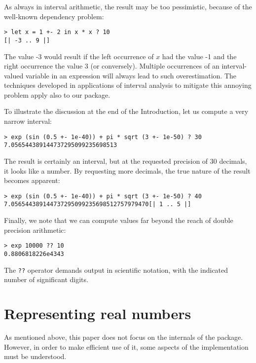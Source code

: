 \documentclass[9pt, a4, twocolumn]{article}
\begin{document}
As always in interval arithmetic,
the result may be too pessimistic, because of the well-known dependency problem:
\begin{verbatim}
> let x = 1 +- 2 in x * x ? 10
[| -3 .. 9 |]
\end{verbatim}
The value -3 would result if the left occurrence of $x$ had the value
-1 and the right occurrence the value 3 (or conversely). Multiple
occurrences of an  interval-valued variable in an expression will always lead to such
overestimation. The techniques developed in applications of interval
analysis to mitigate this annoying problem apply also to our package.

To illustrate the discussion at the end of the Introduction, let us
compute a very narrow interval:
\begin{verbatim}
> exp (sin (0.5 +- 1e-40)) + pi * sqrt (3 +- 1e-50) ? 30
7.056544389144737295099235698513
\end{verbatim}
The result is certainly an interval, but at the requested precision of
30 decimals, it looks like a number. By requesting more decimals, the
true nature of the result becomes apparent:
\begin{verbatim}
> exp (sin (0.5 +- 1e-40)) + pi * sqrt (3 +- 1e-50) ? 40
7.056544389144737295099235698512757979470[| 1 .. 5 |]
\end{verbatim}

Finally, we note that we can compute values far beyond the reach of
double precision arithmetic:
\begin{verbatim}
> exp 10000 ?? 10
0.8806818226e4343
\end{verbatim}
The \texttt{??} operator demands output in scientific notation, with the
indicated number of significant digits.

\section{Representing real numbers}

As mentioned above, this paper does not focus on the
internals of the package. However, in order to make efficient use of it, some
aspects of the implementation must be understood. 
\end{document}
